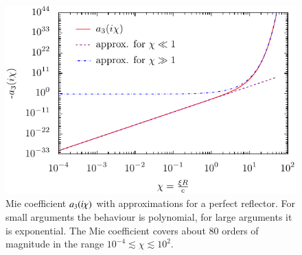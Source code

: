 \begin{figure}
\begin{center}
\includegraphics[scale=1]{plots/mie.pdf}
\end{center}
\caption{Mie coefficient $a_3(i\chi)$ with approximations for a perfect
reflector. For small arguments the behaviour is polynomial, for large arguments
it is exponential. The Mie coefficient covers about 80 orders of magnitude in
the range $10^{-4}\lesssim\chi\lesssim 10^2$.}
\label{fig:optical_properties_mie}
\end{figure}

